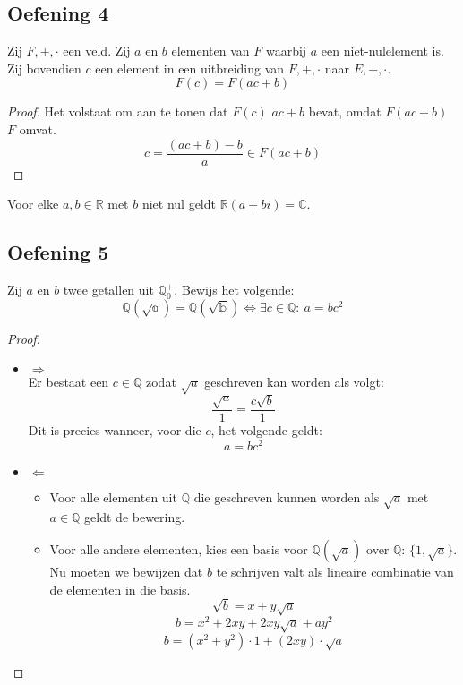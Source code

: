 \documentclass[main.tex]{subfiles}
\begin{document}
\subsection*{Oefening 4}
Zij $F,+,\cdot$ een veld.
Zij $a$ en $b$ elementen van $F$ waarbij $a$ een niet-nulelement is.
Zij bovendien $c$ een element in een uitbreiding van $F,+,\cdot$ naar $E,+,\cdot$.
\[ F(c) = F(ac+b) \]

\begin{proof}
  Het volstaat om aan te tonen dat $F(c)$ $ac+b$ bevat, omdat $F(ac+b)$ $F$ omvat.
  \[ c  = \frac{(ac+b)-b}{a} \in F(ac+b) \]
\end{proof}

\begin{gev}
  Voor elke $a,b \in \mathbb{R}$ met $b$ niet nul geldt $\mathbb{R}(a+bi) = \mathbb{C}$.
\end{gev}

\subsection*{Oefening 5}
Zij $a$ en $b$ twee getallen uit $\mathbb{Q}^{+}_{0}$.
Bewijs het volgende:
\[ \mathbb{Q(\sqrt{a})} = \mathbb{Q(\sqrt{b})} \Leftrightarrow \exists c\in \mathbb{Q}:\ a = bc^{2} \]

\begin{proof}
  \begin{itemize}
  \item $\Rightarrow$\\
    Er bestaat een $c\in \mathbb{Q}$ zodat $\sqrt{a}$ geschreven kan worden als volgt:
    \[ \frac{\sqrt{a}}{1} = \frac{c\sqrt{b}}{1} \]
    Dit is precies wanneer, voor die $c$, het volgende geldt:
    \[ a = bc^{2}\]
  \item $\Leftarrow$\\
    \begin{itemize}
    \item Voor alle elementen uit $\mathbb{Q}$ die geschreven kunnen worden als $\sqrt{a}$ met $a \in \mathbb{Q}$ geldt de bewering.
    \item Voor alle andere elementen, kies een basis voor $\mathbb{Q}(\sqrt{a})$ over $\mathbb{Q}$: $\{1,\sqrt{a}\}$.
      Nu moeten we bewijzen dat $b$ te schrijven valt als lineaire combinatie van de elementen in die basis. 
      \[ \sqrt{b} = x + y\sqrt{a} \]
      \[ b = x^{2} + 2xy+2xy\sqrt{a} +ay^{2}\]
      \[ b = (x^{2}+y^{2})\cdot 1 + (2xy) \cdot \sqrt{a} \]
    \end{itemize}
  \end{itemize}
\end{proof}
\end{document}
